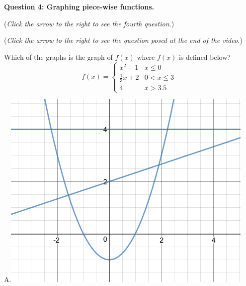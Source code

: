 \documentclass{ximera}
\begin{document}
\textbf{Question 4: Graphing piece-wise functions.}
\begin{question}
\begin{flushright}
{\color{blue}(\emph{Click the arrow to the right to see the fourth question.})}
\end{flushright}
\begin{center}
\begin{expandable}
\begin{flushright}
{\color{blue}(\emph{Click the arrow to the right to see the question
posed at the end of the video.})}
\end{flushright}
\begin{expandable}
Which of the graphs is the graph of $f(x)$ where $f(x)$ is defined below?
\[ f(x) = \begin{cases} 
      x^2-1 & x \leq 0 \\
     \frac{1}{3} x + 2 & 0< x \leq 3 \\
    4 & x>3.5
   \end{cases} \]
   
\begin{multicols}{2}
\begin{center}
A.\includegraphics[scale=0.2]{PWGraph1}
\end{center}


\end{multicols}
\end{expandable}
\end{expandable}
\end{center}
\end{question}
\end{document}
